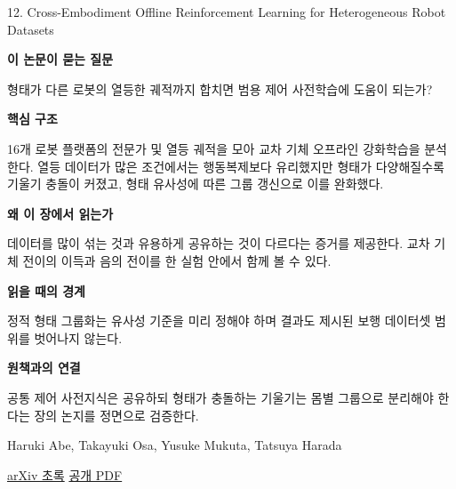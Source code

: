 \documentclass[11pt,openany]{book}
\begin{document}
\begin{termcard}{12. Cross-Embodiment Offline Reinforcement Learning for Heterogeneous Robot Datasets}

\par

\medskip

{\sffamily\bfseries\color{deepblue} 이 논문이 묻는 질문}\par

형태가 다른 로봇의 열등한 궤적까지 합치면 범용 제어 사전학습에 도움이 되는가?

\smallskip

{\sffamily\bfseries\color{deepblue} 핵심 구조}\par

16개 로봇 플랫폼의 전문가 및 열등 궤적을 모아 교차 기체 오프라인 강화학습을 분석한다. 열등 데이터가 많은 조건에서는 행동복제보다 유리했지만 형태가 다양해질수록 기울기 충돌이 커졌고, 형태 유사성에 따른 그룹 갱신으로 이를 완화했다.

\smallskip

{\sffamily\bfseries\color{deepblue} 왜 이 장에서 읽는가}\par

데이터를 많이 섞는 것과 유용하게 공유하는 것이 다르다는 증거를 제공한다. 교차 기체 전이의 이득과 음의 전이를 한 실험 안에서 함께 볼 수 있다.

\smallskip

{\sffamily\bfseries\color{coral} 읽을 때의 경계}\par

정적 형태 그룹화는 유사성 기준을 미리 정해야 하며 결과도 제시된 보행 데이터셋 범위를 벗어나지 않는다.

\smallskip

{\sffamily\bfseries\color{teal} 원책과의 연결}\par

공통 제어 사전지식은 공유하되 형태가 충돌하는 기울기는 몸별 그룹으로 분리해야 한다는 장의 논지를 정면으로 검증한다.

\medskip

{\footnotesize\color{muted} Haruki Abe, Takayuki Osa, Yusuke Mukuta, Tatsuya Harada\par

\href{https://arxiv.org/abs/2602.18025}{arXiv 초록} \quad \href{https://arxiv.org/pdf/2602.18025}{공개 PDF}\par}

\end{termcard}
\end{document}
